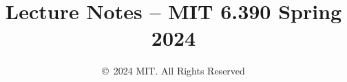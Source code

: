 \documentclass[10pt,oneside]{book}
\title{Lecture Notes -- MIT 6.390 Spring 2024}
\date{\copyright\ 2024 MIT. All Rights Reserved}
\begin{document}
\maketitle
\tableofcontents

\clearpage














% 
% 

\begin{appendices}
    
    
    
    

    \printindex
    \clearpage
    \glsaddall
    \printglossaries
    \clearpage
\end{appendices}

%
%
%
%
%
\end{document}
